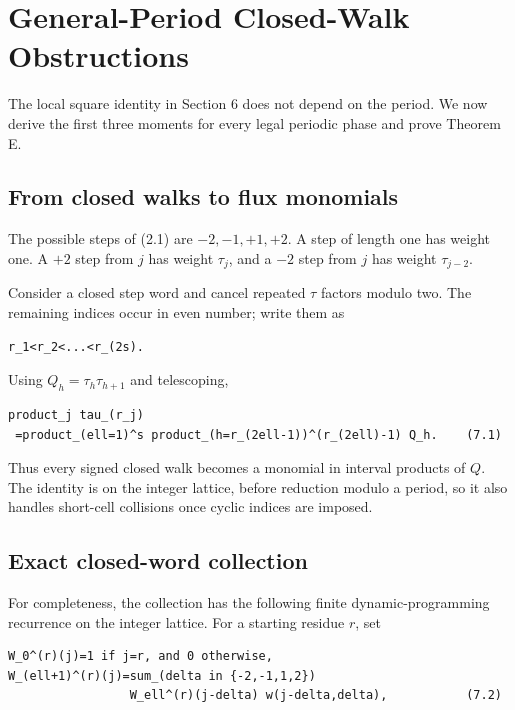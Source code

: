 \section{General-Period Closed-Walk Obstructions}

The local square identity in Section 6 does not depend on the period. We now
derive the first three moments for every legal periodic phase and prove
Theorem E.

\subsection{From closed walks to flux monomials}

The possible steps of (2.1) are \(-2,-1,+1,+2\). A step of length one has
weight one. A \(+2\) step from \(j\) has weight \(\tau_j\), and a \(-2\) step from
\(j\) has weight \(\tau_{j-2}\).

Consider a closed step word and cancel repeated \(\tau\) factors modulo two.
The remaining indices occur in even number; write them as

\begin{lstlisting}[language={}]
r_1<r_2<...<r_(2s).
\end{lstlisting}

Using \(Q_h=\tau_h \tau_{h+1}\) and telescoping,

\begin{lstlisting}[language={}]
product_j tau_(r_j)
 =product_(ell=1)^s product_(h=r_(2ell-1))^(r_(2ell)-1) Q_h.    (7.1)
\end{lstlisting}

Thus every signed closed walk becomes a monomial in interval products of \(Q\).
The identity is on the integer lattice, before reduction modulo a period, so
it also handles short-cell collisions once cyclic indices are imposed.

\subsection{Exact closed-word collection}

For completeness, the collection has the following finite dynamic-programming
recurrence on the integer lattice. For a starting residue \(r\), set

\begin{lstlisting}[language={}]
W_0^(r)(j)=1 if j=r, and 0 otherwise,
W_(ell+1)^(r)(j)=sum_(delta in {-2,-1,1,2})
                 W_ell^(r)(j-delta) w(j-delta,delta),           (7.2)
\end{lstlisting}

